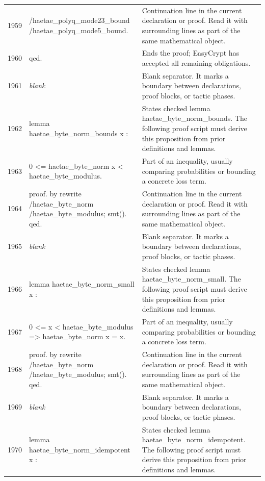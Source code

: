 \documentclass[10pt]{article}
\begin{document}
\begin{longtable}{r L{0.53\textwidth} L{0.37\textwidth}}
1959 & {\ttfamily\scriptsize                    /haetae\_polyq\_mode23\_bound /haetae\_polyq\_mode5\_bound.} & Continuation line in the current declaration or proof.  Read it with surrounding lines as part of the same mathematical object. \\
1960 & {\ttfamily\scriptsize qed.} & Ends the proof; EasyCrypt has accepted all remaining obligations. \\
1961 & {\ttfamily\scriptsize \emph{blank}} & Blank separator.  It marks a boundary between declarations, proof blocks, or tactic phases. \\
1962 & {\ttfamily\scriptsize lemma haetae\_byte\_norm\_bounds x :} & States checked lemma haetae\_byte\_norm\_bounds.  The following proof script must derive this proposition from prior definitions and lemmas. \\
1963 & {\ttfamily\scriptsize   0 <= haetae\_byte\_norm x < haetae\_byte\_modulus.} & Part of an inequality, usually comparing probabilities or bounding a concrete loss term. \\
1964 & {\ttfamily\scriptsize proof. by rewrite /haetae\_byte\_norm /haetae\_byte\_modulus; smt(). qed.} & Continuation line in the current declaration or proof.  Read it with surrounding lines as part of the same mathematical object. \\
1965 & {\ttfamily\scriptsize \emph{blank}} & Blank separator.  It marks a boundary between declarations, proof blocks, or tactic phases. \\
1966 & {\ttfamily\scriptsize lemma haetae\_byte\_norm\_small x :} & States checked lemma haetae\_byte\_norm\_small.  The following proof script must derive this proposition from prior definitions and lemmas. \\
1967 & {\ttfamily\scriptsize   0 <= x < haetae\_byte\_modulus => haetae\_byte\_norm x = x.} & Part of an inequality, usually comparing probabilities or bounding a concrete loss term. \\
1968 & {\ttfamily\scriptsize proof. by rewrite /haetae\_byte\_norm /haetae\_byte\_modulus; smt(). qed.} & Continuation line in the current declaration or proof.  Read it with surrounding lines as part of the same mathematical object. \\
1969 & {\ttfamily\scriptsize \emph{blank}} & Blank separator.  It marks a boundary between declarations, proof blocks, or tactic phases. \\
1970 & {\ttfamily\scriptsize lemma haetae\_byte\_norm\_idempotent x :} & States checked lemma haetae\_byte\_norm\_idempotent.  The following proof script must derive this proposition from prior definitions and lemmas. \\

\end{longtable}
\end{document}
